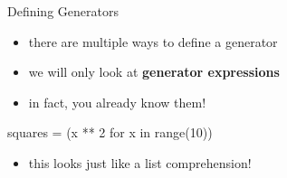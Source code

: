 \begin{frame}[fragile]{Defining Generators}

    \begin{itemize}
        \item there are multiple ways to define a generator
        \item we will only look at {\bf generator expressions}
        \item in fact, you already know them!
    \end{itemize}

    \vspace{1em}

    \begin{pythoncode}
    squares = (x ** 2 for x in range(10))
    \end{pythoncode}

    \vspace{1em}

    \begin{itemize}
        \item this looks just like a list comprehension!
    \end{itemize}

\end{frame}

